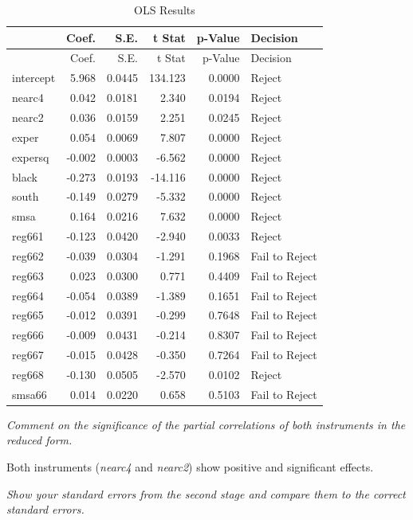 \documentclass[11pt,]{article}
\newenvironment{Shaded}{\begin{snugshade}}{\end{snugshade}}
\newcommand{\KeywordTok}[1]{\textcolor[rgb]{0.13,0.29,0.53}{\textbf{#1}}}
\newcommand{\DataTypeTok}[1]{\textcolor[rgb]{0.13,0.29,0.53}{#1}}
\newcommand{\StringTok}[1]{\textcolor[rgb]{0.31,0.60,0.02}{#1}}
\newcommand{\OperatorTok}[1]{\textcolor[rgb]{0.81,0.36,0.00}{\textbf{#1}}}
\newcommand{\NormalTok}[1]{#1}
\begin{document}
\begin{longtable}[]{@{}lrrrrl@{}}
\caption{OLS Results}\tabularnewline
\toprule
& Coef. & S.E. & t Stat & p-Value & Decision\tabularnewline
\midrule
\endfirsthead
\toprule
& Coef. & S.E. & t Stat & p-Value & Decision\tabularnewline
\midrule
\endhead
intercept & 5.968 & 0.0445 & 134.123 & 0.0000 & Reject\tabularnewline
nearc4 & 0.042 & 0.0181 & 2.340 & 0.0194 & Reject\tabularnewline
nearc2 & 0.036 & 0.0159 & 2.251 & 0.0245 & Reject\tabularnewline
exper & 0.054 & 0.0069 & 7.807 & 0.0000 & Reject\tabularnewline
expersq & -0.002 & 0.0003 & -6.562 & 0.0000 & Reject\tabularnewline
black & -0.273 & 0.0193 & -14.116 & 0.0000 & Reject\tabularnewline
south & -0.149 & 0.0279 & -5.332 & 0.0000 & Reject\tabularnewline
smsa & 0.164 & 0.0216 & 7.632 & 0.0000 & Reject\tabularnewline
reg661 & -0.123 & 0.0420 & -2.940 & 0.0033 & Reject\tabularnewline
reg662 & -0.039 & 0.0304 & -1.291 & 0.1968 & Fail to
Reject\tabularnewline
reg663 & 0.023 & 0.0300 & 0.771 & 0.4409 & Fail to Reject\tabularnewline
reg664 & -0.054 & 0.0389 & -1.389 & 0.1651 & Fail to
Reject\tabularnewline
reg665 & -0.012 & 0.0391 & -0.299 & 0.7648 & Fail to
Reject\tabularnewline
reg666 & -0.009 & 0.0431 & -0.214 & 0.8307 & Fail to
Reject\tabularnewline
reg667 & -0.015 & 0.0428 & -0.350 & 0.7264 & Fail to
Reject\tabularnewline
reg668 & -0.130 & 0.0505 & -2.570 & 0.0102 & Reject\tabularnewline
smsa66 & 0.014 & 0.0220 & 0.658 & 0.5103 & Fail to Reject\tabularnewline
\bottomrule
\end{longtable}

\emph{Comment on the significance of the partial correlations of both
instruments in the reduced form.}

Both instruments (\emph{nearc4} and \emph{nearc2}) show positive and
significant effects.

\emph{Show your standard errors from the second stage and compare them
to the correct standard errors.}

\begin{Shaded}
\end{Shaded}
\end{document}
